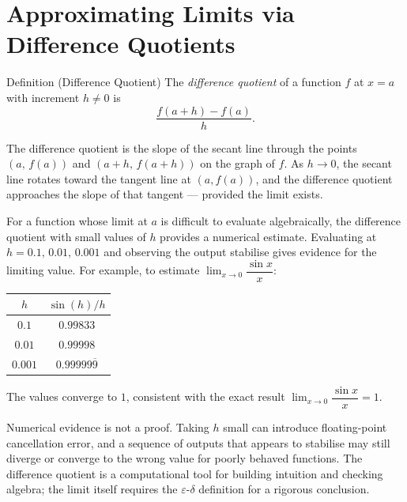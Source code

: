 \section{Approximating Limits via Difference Quotients}

\begin{propositionbox}{Definition (Difference Quotient)}
The \emph{difference quotient} of a function $f$ at $x = a$ with
increment $h \neq 0$ is
\[
  \frac{f(a + h) - f(a)}{h}.
\]
\end{propositionbox}

\begin{remark*}
The difference quotient is the slope of the secant line through
the points $(a,\, f(a))$ and $(a+h,\, f(a+h))$ on the graph of $f$.
As $h \to 0$, the secant line rotates toward the tangent line at
$(a, f(a))$, and the difference quotient approaches the slope of
that tangent --- provided the limit exists.
\end{remark*}

\begin{remark*}
For a function whose limit at $a$ is difficult to evaluate
algebraically, the difference quotient with small values of $h$
provides a numerical estimate.
Evaluating at $h = 0.1,\, 0.01,\, 0.001$ and observing the
output stabilise gives evidence for the limiting value.
For example, to estimate $\lim_{x \to 0} \dfrac{\sin x}{x}$:

\medskip
\begin{center}
\begin{tabular}{@{}cc@{}}
\textbf{$h$} & \textbf{$\sin(h)/h$} \\
\hline
$0.1$    & $0.99833$ \\
$0.01$   & $0.99998$ \\
$0.001$  & $0.99999\overline{9}$ \\
\end{tabular}
\end{center}
\medskip

The values converge to $1$, consistent with the exact result
$\lim_{x \to 0} \dfrac{\sin x}{x} = 1$.
\end{remark*}

\begin{remark*}
Numerical evidence is not a proof.
Taking $h$ small can introduce floating-point cancellation error,
and a sequence of outputs that appears to stabilise may still
diverge or converge to the wrong value for poorly behaved
functions.
The difference quotient is a computational tool for building
intuition and checking algebra; the limit itself requires the
$\varepsilon$-$\delta$ definition for a rigorous conclusion.
\end{remark*}